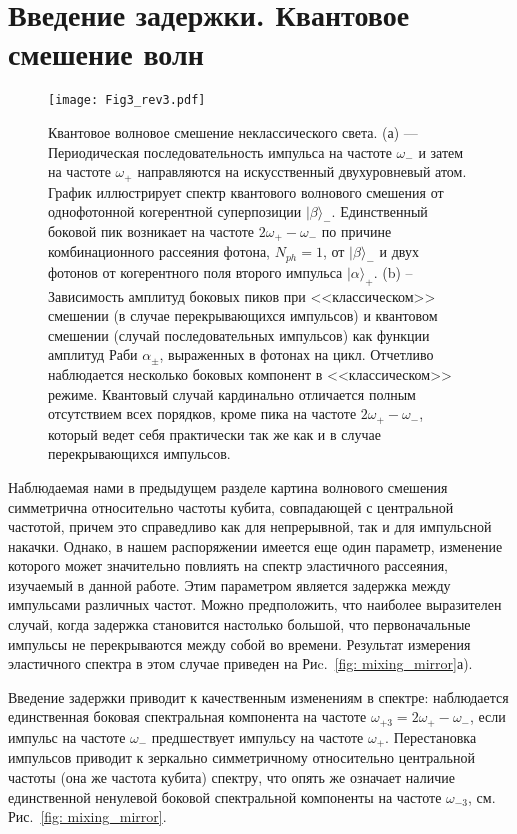 \section{Введение задержки. Квантовое смешение волн}
\label{sec: qwm}
\begin{figure}
	\centering
	\texttt{[image: Fig3\_rev3.pdf]}
	\caption[Квантовое волновое смешение неперекрывающихся импульсов: трехпиковый спектр.]{Квантовое волновое смешение неклассического света. (а) ---  Периодическая последовательность импульса на частоте $\omega_-$ и затем на частоте $\omega_+$ направляются на искусственный двухуровневый атом. График иллюстрирует спектр квантового волнового смешения от однофотонной когерентной суперпозиции $|\beta\rangle_-$. Единственный боковой пик возникает на частоте $2\omega_+ - \omega_-$ по причине комбинационного рассеяния фотона, $N_{ph} = 1$, от $|\beta\rangle_-$ и двух фотонов от когерентного поля второго импульса $|\alpha\rangle_+$. (b) -- Зависимость амплитуд боковых пиков при <<классическом>> смешении (в случае перекрывающихся импульсов) и квантовом смешении (случай последовательных импульсов) как функции амплитуд Раби  
		$\alpha_\pm$, выраженных в фотонах на цикл. Отчетливо наблюдается несколько боковых компонент в <<классическом>> режиме. Квантовый случай кардинально отличается полным отсутствием всех порядков, кроме пика на частоте $2\omega_+ - \omega_-$, который ведет себя практически так же как и в случае перекрывающихся импульсов. 
	}
	\label{fig: mixing_3peaks}
\end{figure}
Наблюдаемая нами в предыдущем разделе картина волнового смешения симметрична относительно частоты кубита, совпадающей с центральной частотой, причем это справедливо как для непрерывной, так и для импульсной накачки. Однако, в нашем распоряжении имеется еще один параметр, изменение которого может значительно повлиять на спектр эластичного рассеяния, изучаемый в данной работе. Этим параметром является задержка между импульсами различных частот. Можно предположить, что наиболее выразителен случай, когда задержка становится настолько большой, что первоначальные импульсы не перекрываются между собой во времени. Результат измерения эластичного спектра в этом случае приведен на Риc.~\ref{fig: mixing_mirror}а).

Введение задержки приводит к качественным изменениям в спектре: наблюдается единственная боковая спектральная компонента на частоте $\omega_{+3} = 2\omega_+-\omega_-$, если импульс на частоте $\omega_-$ предшествует импульсу на частоте $\omega_+$. Перестановка импульсов приводит к зеркально симметричному относительно центральной частоты (она же частота кубита) спектру, что опять же означает наличие единственной ненулевой боковой спектральной компоненты на частоте $\omega_{-3}$, см. Рис.~\ref{fig: mixing_mirror}. 
 
